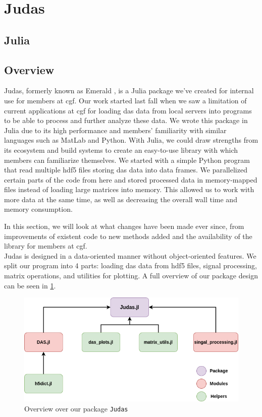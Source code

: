 \section{Judas}
\label{met:Judas}

\subsection{Julia}

\subsection{Overview}

Judas, formerly known as Emerald \cite{projthesis}, is a Julia package we've created for internal use for members at \acrshort{cgf}. Our work started last fall when we saw a limitation of current applications at \acrshort{cgf} for loading \acrshort{das} data from local servers into programs to be able to process and further analyze these data. We wrote this package in Julia due to its high performance and members' familiarity with similar languages such as MatLab and Python. With Julia, we could draw strengths from its ecosystem and build systems to create an easy-to-use library with which members can familiarize themselves. We started with a simple Python program that read multiple \acrshort{hdf5} files storing \acrshort{das} data into data frames. We parallelized certain parts of the code from here and stored processed data in memory-mapped files instead of loading large matrices into memory. This allowed us to work with more data at the same time, as well as decreasing the overall wall time and memory consumption.  

In this section, we will look at what changes have been made ever since, from improvements of existent code to new methods added and the availability of the library for members at \acrshort{cgf}. \\

Judas is designed in a data-oriented manner without object-oriented features. We split our program into 4 parts: loading \acrshort{das} data from \acrshort{hdf5} files, signal processing, matrix operations, and utilities for plotting. A full overview of our package design can be seen in \ref{fig:judasoverview}.\\

\begin{figure}[!h]
    \centering
    \includegraphics[scale=.6]{figures/judas_overview.png}
    \caption{Overview over our package \texttt{Judas}}
    \label{fig:judasoverview}
\end{figure}

